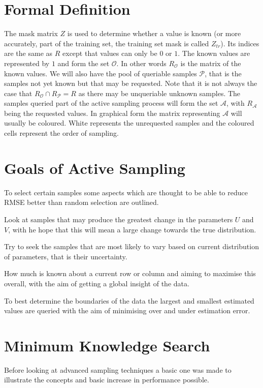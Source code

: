 \section{Formal Definition}
The mask matrix $Z$ is used to determine whether a value is known (or more accurately, part of the training set, the training set mask is called $Z_{tr}$). Its indices are the same as $R$ except that values can only be $0$ or $1$. The known values are represented by $1$ and form the set $\mathcal{O}$. In other words $R_\mathcal{O}$ is the matrix of the known values. We will also have the pool of queriable samples $\mathcal{P}$, that is the samples not yet known but that may be requested. Note that it is not always the case that $R_{\mathcal{O}} \cap R_{\mathcal{P}} = R$ as there may be unqueriable unknown samples. The samples queried part of the active sampling process will form the set $\mathcal{A}$, with $R_{\mathcal{A}}$ being the requested values. In graphical form the matrix representing $\mathcal{A}$ will usually be coloured. White represents the unrequested samples and the coloured cells represent the order of sampling.


\section{Goals of Active Sampling}
\label{sec:as_goals}
To select certain samples some aspects which are thought to be able to reduce RMSE better than random selection are outlined.

\begin{description}[style=standard,leftmargin=.7cm,font=\bfseries]
  \item[Model] Look at samples that may produce the greatest change in the parameters $U$ and $V$, with he hope that this will mean a large change towards the true distribution.
  \item[Sample Uncertainty] Try to seek the samples that are most likely to vary based on current distribution of parameters, that is their uncertainty.
  \item[Knowledge] How much is known about a current row or column and aiming to maximise this overall, with the aim of getting a global insight of the data.
  \item[Max-Minimum] To best determine the boundaries of the data the largest and smallest estimated values are queried with the aim of minimising over and under estimation error.
\end{description}


\section{Minimum Knowledge Search}
\label{sec:mks_alg}
Before looking at advanced sampling techniques a basic one was made to illustrate the concepts and basic increase in performance possible.
